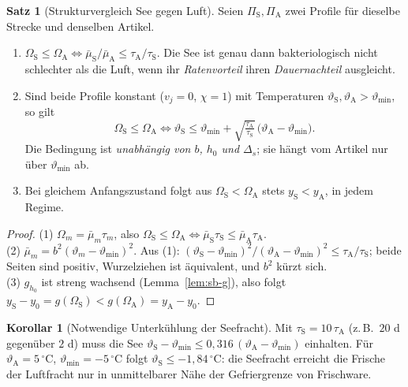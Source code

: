 \documentclass[a4paper, 12pt, twoside, openright]{report}
\theoremstyle{definition}
\theoremstyle{definition}
\newtheorem{satz}{Satz}[chapter]
\newtheorem{korollar}{Korollar}[chapter]
\begin{document}
\begin{satz}[Strukturvergleich See gegen Luft]\label{satz:sb-vergleich}
Seien $\Pi_{\mathrm S},\Pi_{\mathrm A}$ zwei Profile für dieselbe Strecke und denselben Artikel.
\begin{enumerate}
  \item $\Omega_{\mathrm S}\le\Omega_{\mathrm A}\iff\bar\mu_{\mathrm S}/\bar\mu_{\mathrm A}\le\tau_{\mathrm A}/\tau_{\mathrm S}$.
    Die See ist genau dann bakteriologisch nicht schlechter als die Luft, wenn ihr
    \emph{Ratenvorteil} ihren \emph{Dauernachteil} ausgleicht.
  \item Sind beide Profile konstant ($v_j=0$, $\chi=1$) mit Temperaturen
    $\vartheta_{\mathrm S},\vartheta_{\mathrm A}>\vartheta_{\min}$, so gilt
    \begin{equation}
      \Omega_{\mathrm S}\le\Omega_{\mathrm A}\iff
      \vartheta_{\mathrm S}\le\vartheta_{\min}+\sqrt{\tfrac{\tau_{\mathrm A}}{\tau_{\mathrm S}}}\,
      \bigl(\vartheta_{\mathrm A}-\vartheta_{\min}\bigr).
      \label{eq:sb-gleich}
    \end{equation}
    Die Bedingung ist \emph{unabhängig von $b$, $h_0$ und $\Delta_s$}; sie hängt vom
    Artikel nur über $\vartheta_{\min}$ ab.
  \item Bei gleichem Anfangszustand folgt aus $\Omega_{\mathrm S}<\Omega_{\mathrm A}$ stets
    $y_{\mathrm S}<y_{\mathrm A}$, in jedem Regime.
\end{enumerate}
\end{satz}

\begin{proof}
(1) $\Omega_m=\bar\mu_m\tau_m$, also $\Omega_{\mathrm S}\le\Omega_{\mathrm A}\iff\bar\mu_{\mathrm S}\tau_{\mathrm S}\le\bar\mu_{\mathrm A}\tau_{\mathrm A}$.\\
(2) $\bar\mu_m=b^2(\vartheta_m-\vartheta_{\min})^2$. Aus (1):
$(\vartheta_{\mathrm S}-\vartheta_{\min})^2/(\vartheta_{\mathrm A}-\vartheta_{\min})^2\le\tau_{\mathrm A}/\tau_{\mathrm S}$;
beide Seiten sind positiv, Wurzelziehen ist äquivalent, und $b^2$ kürzt sich.\\
(3) $g_{h_0}$ ist streng wachsend (Lemma~\ref{lem:sb-g}), also folgt $y_{\mathrm S}-y_0=g(\Omega_{\mathrm S})<g(\Omega_{\mathrm A})=y_{\mathrm A}-y_0$.
\end{proof}

\begin{korollar}[Notwendige Unterkühlung der Seefracht]\label{kor:sb-unterkuehl}
Mit $\tau_{\mathrm S}=10\,\tau_{\mathrm A}$ (z.\,B.\ $20$ d gegenüber $2$ d) muss die See
$\vartheta_{\mathrm S}-\vartheta_{\min}\le0{,}316\,(\vartheta_{\mathrm A}-\vartheta_{\min})$
einhalten. Für $\vartheta_{\mathrm A}=5\,{}^\circ$C, $\vartheta_{\min}=-5\,{}^\circ$C folgt
$\vartheta_{\mathrm S}\le-1{,}84\,{}^\circ$C: die Seefracht erreicht die Frische der Luftfracht nur
in unmittelbarer Nähe der Gefriergrenze von Frischware.
\end{korollar}
\end{document}
